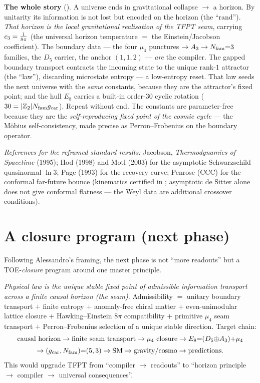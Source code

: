 \par\smallskip\noindent\textbf{The whole story} (\mC).
A universe ends in gravitational collapse $\to$ a horizon. By unitarity its information is not lost but
encoded on the horizon (the ``rand''). \emph{That horizon is the local gravitational realisation of the
TFPT seam}, carrying $c_3=\tfrac1{8\pi}$ (the universal horizon temperature $=$ the Einstein/Jacobson
coefficient). The boundary data --- the four
$\mu_4$ punctures $\to A_3\to N_{\mathrm{fam}}{=}3$ families, the $D_5$ carrier, the anchor $(1,1,2)$ --- \emph{are} the
compiler. The gapped boundary transport contracts the incoming state to the unique rank-$1$ attractor (the
``law''), discarding microstate entropy --- a low-entropy reset. That law seeds the next universe with the
\emph{same} constants, because they are the attractor's fixed point; and the hull $E_8$ carries a built-in
order-$30$ cyclic rotation ($30=|\mathbb Z_2|N_{\mathrm{fam}}g_{\mathrm{car}}$). Repeat without end. The constants are parameter-free
because they are the \emph{self-reproducing fixed point of the cosmic cycle} --- the M\"obius
self-consistency, made precise as Perron--Frobenius on the boundary operator.

\noindent\emph{References for the reframed standard results:} Jacobson, \textit{Thermodynamics of Spacetime}
(1995); Hod (1998) and Motl (2003) for the asymptotic Schwarzschild quasinormal $\ln3$; Page (1993) for the
recovery curve; Penrose (CCC) for the conformal far-future bounce (kinematics certified in ; asymptotic de Sitter alone does not give conformal flatness --- the Weyl data are additional crossover conditions).

\section{A closure program (next phase) \mO}\label{sec:program}
Following Alessandro's framing, the next phase is not ``more readouts'' but a TOE-\emph{closure} program
around one master principle.

\begin{keybox}
\emph{Physical law is the unique stable fixed point of admissible information transport across a finite
causal horizon (the seam).} Admissibility $=$ unitary boundary transport $+$ finite entropy $+$ anomaly-free
chiral matter $+$ even-unimodular lattice closure $+$ Hawking--Einstein $8\pi$ compatibility $+$ primitive
$\mu_4$ seam transport $+$ Perron--Frobenius selection of a unique stable direction. Target chain:
\[
  \begin{gathered}
  \text{causal horizon}\to\text{finite seam transport}\to\mu_4\text{ closure}\to E_8{=}(D_5{\oplus}A_3){+}\mu_4\\[2pt]
  \to(g_{\mathrm{car}},N_{\mathrm{fam}}){=}(5,3)\to\text{SM}\to\text{gravity/cosmo}\to\text{predictions}.
  \end{gathered}
\]
This would upgrade TFPT from ``compiler $\to$ readouts'' to ``horizon principle $\to$ compiler $\to$ universal
consequences''.
\end{keybox}

